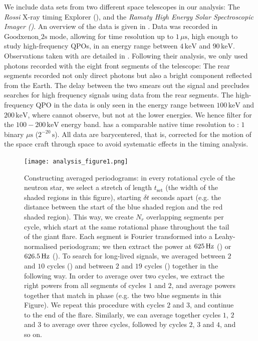 \documentclass{emulateapj}
\begin{document}
We include data sets from two different space telescopes in our analysis: The {\it Rossi} X-ray timing Explorer (\rxte), and the {\it Ramaty High Energy Solar Spectroscopic Imager (\rhessi)}. An overview of the \rxte data is given in \citet{Israel05}. Data was recorded in $\mathrm{Goodxenon\_2s}$ mode, allowing for time resolution up to $1 \, \mu \mathrm{s}$, high enough to study high-frequency QPOs, in an energy range between $4 \, \mathrm{keV}$ and $90 \, \mathrm{keV}$.
Observations taken with \rhessi are detailed in \citet{Watts06}. Following their analysis, we only used photons recorded with the eight front segments of the telescope: The rear segments recorded not only direct photons but also a bright component reflected from the Earth. The delay between the two smears out the signal and precludes searches for high frequency signals using data from the rear segments. The high-frequency QPO in the \rhessi data is only seen in the energy range between $100 \, \mathrm{keV}$ and $200 \, \mathrm{keV}$, where \rxte cannot observe, but not at the lower energies. We hence filter for the $100 - 200 \, \mathrm{keV}$ energy band.  \rhessi has a comparable native time resolution to \rxte: $1$ binary $\mu\mathrm{s}$ ($2^{-20} \, \mathrm{s}$). All data are barycentered, that is, corrected for the motion of the space craft through space to avoid systematic effects in the timing analysis.
\begin{figure}[htbp]
\begin{center}
\texttt{[image: analysis\_figure1.png]}
\caption{Constructing averaged periodograms: in every rotational cycle of the neutron star, we select a stretch of length $t_{\mathrm{set}}$ (the width of the shaded regions in this figure), starting $\delta t$ seconds apart (e.g. the distance between the start of the blue shaded region and the red shaded region). This way, we create $N_r$ overlapping segments per cycle, which start at the same
 rotational phase throughout the tail of the giant flare. Each segment is Fourier transformed into a Leahy-normalised periodogram; we then extract the power at $625 \,\mathrm{Hz}$ (\rxte) or $626.5\,\mathrm{Hz}$ (\rhessi). To search for long-lived signals, we averaged between $2$ and $10$ cycles (\rxte) and between $2$ and $19$ cycles (\rhessi) together in the following way. In order to average over two cycles, we extract the right powers from all segments of cycles $1$ and $2$, and average powers together that match in phase (e.g. the two blue segments in this Figure). We repeat this procedure with cycles $2$ and $3$, and continue to the end of the flare. Similarly, we can average together cycles $1$, $2$ and $3$ to average over three cycles, followed by cycles $2$, $3$ and $4$, and so on. }
\label{fig:analysis1}
\end{center}
\end{figure}
\end{document}
